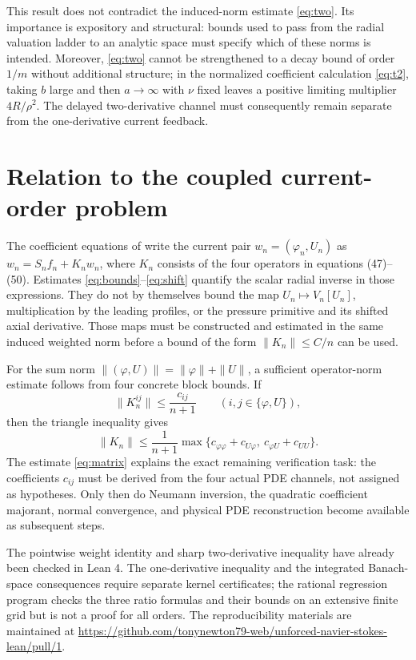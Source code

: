 \documentclass[11pt]{article}
\begin{document}
\noindent This result does not contradict the induced-norm estimate \eqref{eq:two}. Its importance is expository and structural: bounds used to pass from the radial valuation ladder to an analytic space must specify which of these norms is intended. Moreover, \eqref{eq:two} cannot be strengthened to a decay bound of order $1/m$ without additional structure; in the normalized coefficient calculation \eqref{eq:t2}, taking $b$ large and then $a\to\infty$ with $\nu$ fixed leaves a positive limiting multiplier $4R/\rho^2$. The delayed two-derivative channel must consequently remain separate from the one-derivative current feedback.

\section{Relation to the coupled current-order problem}
The coefficient equations of \cite{newton2026} write the current pair $w_n=(\varphi_n,U_n)$ as $w_n=S_nf_n+K_nw_n$, where $K_n$ consists of the four operators in equations (47)--(50). Estimates \eqref{eq:bounds}--\eqref{eq:shift} quantify the scalar radial inverse in those expressions. They do not by themselves bound the map $U_n\mapsto V_n[U_n]$, multiplication by the leading profiles, or the pressure primitive and its shifted axial derivative. Those maps must be constructed and estimated in the same induced weighted norm before a bound of the form $\|K_n\|\le C/n$ can be used.

For the sum norm $\|(\varphi,U)\|=\|\varphi\|+\|U\|$, a sufficient operator-norm estimate follows from four concrete block bounds. If
\[
 \|K_n^{ij}\|\le\frac{c_{ij}}{n+1}\qquad (i,j\in\{\varphi,U\}),
\]
then the triangle inequality gives
\begin{equation}\label{eq:matrix}
 \|K_n\|\le\frac{1}{n+1}
 \max\{c_{\varphi\varphi}+c_{U\varphi},\
 c_{\varphi U}+c_{UU}\}.
\end{equation}
The estimate \eqref{eq:matrix} explains the exact remaining verification task: the coefficients $c_{ij}$ must be derived from the four actual PDE channels, not assigned as hypotheses. Only then do Neumann inversion, the quadratic coefficient majorant, normal convergence, and physical PDE reconstruction become available as subsequent steps.

The pointwise weight identity and sharp two-derivative inequality have already been checked in Lean 4. The one-derivative inequality and the integrated Banach-space consequences require separate kernel certificates; the rational regression program checks the three ratio formulas and their bounds on an extensive finite grid but is not a proof for all orders. The reproducibility materials are maintained at \url{https://github.com/tonynewton79-web/unforced-navier-stokes-lean/pull/1}.
\end{document}
